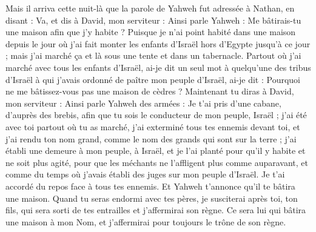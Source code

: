 \begin{multicols}{2}
Mais il arriva cette nuit-là que la parole de Yahweh fut adressée à Nathan, en disant :
Va, et dis à David, mon serviteur : Ainsi parle Yahweh : Me bâtirais-tu une maison afin que j'y habite ?
Puisque je n'ai point habité dans une maison depuis le jour où j'ai fait monter les enfants d'Israël hors d'Egypte jusqu'à ce jour ; mais j'ai marché ça et là sous une tente et dans un tabernacle.
Partout où j'ai marché avec tous les enfants d'Israël, ai-je dit un seul mot à quelqu'une des tribus d'Israël à qui j'avais ordonné de paître mon peuple d'Israël, ai-je dit : Pourquoi ne me bâtissez-vous pas une maison de cèdres ?
Maintenant tu diras à David, mon serviteur : Ainsi parle Yahweh des armées : Je t'ai pris d'une cabane, d'auprès des brebis, afin que tu sois le conducteur de mon peuple, Israël ;
j'ai été avec toi partout où tu as marché, j'ai exterminé tous tes ennemis devant toi, et j'ai rendu ton nom grand, comme le nom des grands qui sont sur la terre ;
j'ai établi une demeure à mon peuple, à Israël, et je l'ai planté pour qu'il y habite et ne soit plus agité, pour que les méchants ne l'affligent plus comme auparavant,
et comme du temps où j'avais établi des juges sur mon peuple d'Israël. Je t'ai accordé du repos face à tous tes ennemis. Et Yahweh t'annonce qu'il te bâtira une maison.
Quand tu seras endormi avec tes pères, je susciterai après toi, ton fils, qui sera sorti de tes entrailles et j'affermirai son règne.
Ce sera lui qui bâtira une maison à mon Nom, et j'affermirai pour toujours le trône de son règne.

\end{multicols}
